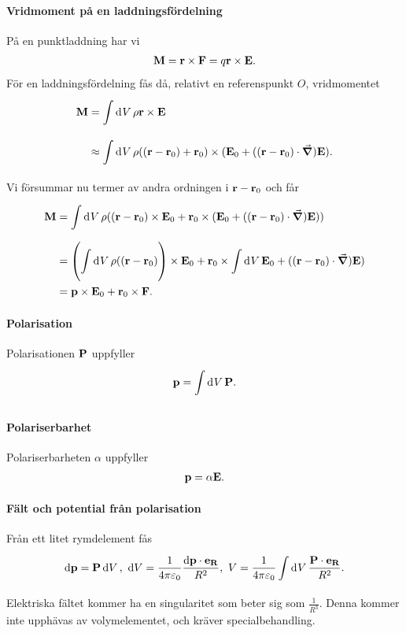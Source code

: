 \paragraph{Vridmoment på en laddningsfördelning}
På en punktladdning har vi
\begin{align*}
	\vb{M} = \vb{r}\times\vb{F} = q\vb{r}\times\vb{E}.
\end{align*}
För en laddningsfördelning fås då, relativt en referenspunkt $O$, vridmomentet
\begin{align*}
	\vb{M} &= \int\limits_{}^{}\dd[]{V}\rho\vb{r}\times\vb{E} \\
	       &\approx \int\limits_{}^{}\dd[]{V}\rho((\vb{r} - \vb{r}_{0}) + \vb{r}_{0})\times(\vb{E}_{0} + ((\vb{r} - \vb{r}_{0})\cdot\grad)\vb{E}).
\end{align*}
Vi försummar nu termer av andra ordningen i $\vb{r} - \vb{r}_{0}$ och får
\begin{align*}
	\vb{M} &= \int\limits_{}^{}\dd[]{V}\rho((\vb{r} - \vb{r}_{0})\times\vb{E}_{0} + \vb{r}_{0}\times(\vb{E}_{0} + ((\vb{r} - \vb{r}_{0})\cdot\grad)\vb{E})) \\
	       &= \left(\int\limits_{}^{}\dd[]{V}\rho((\vb{r} - \vb{r}_{0})\right)\times\vb{E}_{0} + \vb{r}_{0}\times\int\limits_{}^{}\dd[]{V}\vb{E}_{0} + ((\vb{r} - \vb{r}_{0})\cdot\grad)\vb{E}) \\
	       &= \vb{p}\times\vb{E}_{0} + \vb{r}_{0}\times\vb{F}.
\end{align*}

\paragraph{Polarisation}
Polarisationen $\vb{P}$ uppfyller
\begin{align*}
	\vb{p} = \int\limits_{}^{}\dd[]{V}\vb{P}.
\end{align*}

\paragraph{Polariserbarhet}
Polariserbarheten $\alpha$ uppfyller
\begin{align*}
	\vb{p} = \alpha\vb{E}.
\end{align*}

\paragraph{Fält och potential från polarisation}
Från ett litet rymdelement fås
\begin{align*}
	\dd{\vb{p}} = \vb{P}\dd{V},\ \dd{V} = \frac{1}{4\pi\varepsilon_{0}}\frac{\dd{\vb{p}}\cdot\vb{e}_{\vb{R}}}{R^{2}},\ V = \frac{1}{4\pi\varepsilon_{0}}\int\limits_{}^{}\dd[]{V}\frac{\vb{P}\cdot\vb{e}_{\vb{R}}}{R^{2}}.
\end{align*}
Elektriska fältet kommer ha en singularitet som beter sig som $\frac{1}{R^{3}}$. Denna kommer inte upphävas av volymelementet, och kräver specialbehandling.

